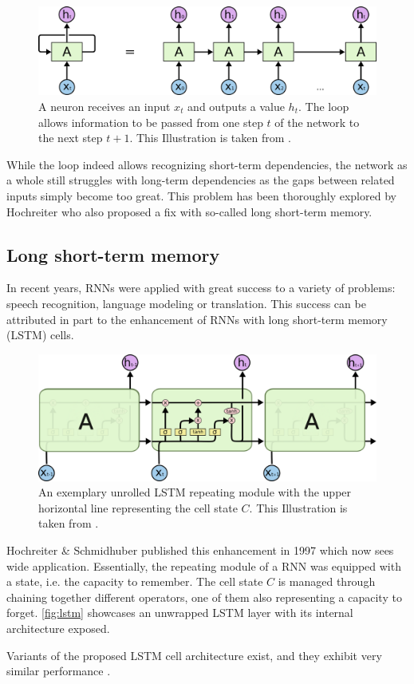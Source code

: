 \begin{figure}
    \centering
    \includegraphics[width=\textwidth]{gfx/rnn-unrolled.png}
    \caption{A neuron receives an input $x_t$ and outputs a value $h_t$. The loop allows information to be passed from one step $t$ of the network to the next step $t+1$. This Illustration is taken from \cite{web:colah}.}
    \label{fig:rnn-unrolled}
\end{figure}

While the loop indeed allows recognizing short-term dependencies, the network as a whole still struggles with long-term dependencies as the gaps between related inputs simply become too great. This problem has been thoroughly explored by Hochreiter \cite{hochreiter1991untersuchungen} who also proposed a fix with so-called long short-term memory.

\subsection{Long short-term memory}
In recent years, RNNs were applied with great success to a variety of problems: speech recognition, language modeling or translation. This success can be attributed in part to the enhancement of RNNs with long short-term memory (LSTM) cells.

\begin{figure}
    \centering
    \includegraphics[width=\textwidth]{gfx/lstm-chain.png}
    \caption{An exemplary unrolled LSTM repeating module with the upper horizontal line representing the cell state $C$. This Illustration is taken from \cite{web:colah}.}
    \label{fig:lstm}
\end{figure}

Hochreiter \& Schmidhuber published this enhancement in 1997 \cite{hochreiter1997} which now sees wide application. Essentially, the repeating module of a RNN was equipped with a state, i.e. the capacity to remember. The cell state $C$ is managed through chaining together different operators, one of them also representing a capacity to forget. \autoref{fig:lstm} showcases an unwrapped LSTM layer with its internal architecture exposed.

Variants of the proposed LSTM cell architecture exist, and they exhibit very similar performance \cite{greff2017lstm}.